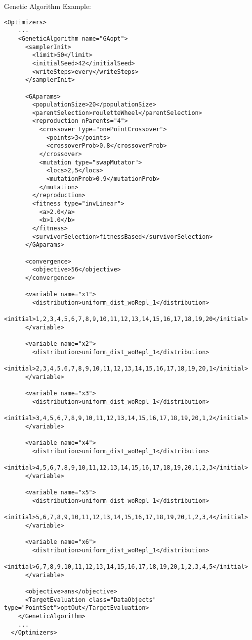 \hspace{24pt}
Genetic Algorithm Example:
\begin{lstlisting}[style=XML]
  <Optimizers>
    ...
    <GeneticAlgorithm name="GAopt">
      <samplerInit>
        <limit>50</limit>
        <initialSeed>42</initialSeed>
        <writeSteps>every</writeSteps>
      </samplerInit>

      <GAparams>
        <populationSize>20</populationSize>
        <parentSelection>rouletteWheel</parentSelection>
        <reproduction nParents="4">
          <crossover type="onePointCrossover">
            <points>3</points>
            <crossoverProb>0.8</crossoverProb>
          </crossover>
          <mutation type="swapMutator">
            <locs>2,5</locs>
            <mutationProb>0.9</mutationProb>
          </mutation>
        </reproduction>
        <fitness type="invLinear">
          <a>2.0</a>
          <b>1.0</b>
        </fitness>
        <survivorSelection>fitnessBased</survivorSelection>
      </GAparams>

      <convergence>
        <objective>56</objective>
      </convergence>

      <variable name="x1">
        <distribution>uniform_dist_woRepl_1</distribution>
        <initial>1,2,3,4,5,6,7,8,9,10,11,12,13,14,15,16,17,18,19,20</initial>
      </variable>

      <variable name="x2">
        <distribution>uniform_dist_woRepl_1</distribution>
        <initial>2,3,4,5,6,7,8,9,10,11,12,13,14,15,16,17,18,19,20,1</initial>
      </variable>

      <variable name="x3">
        <distribution>uniform_dist_woRepl_1</distribution>
        <initial>3,4,5,6,7,8,9,10,11,12,13,14,15,16,17,18,19,20,1,2</initial>
      </variable>

      <variable name="x4">
        <distribution>uniform_dist_woRepl_1</distribution>
        <initial>4,5,6,7,8,9,10,11,12,13,14,15,16,17,18,19,20,1,2,3</initial>
      </variable>

      <variable name="x5">
        <distribution>uniform_dist_woRepl_1</distribution>
        <initial>5,6,7,8,9,10,11,12,13,14,15,16,17,18,19,20,1,2,3,4</initial>
      </variable>

      <variable name="x6">
        <distribution>uniform_dist_woRepl_1</distribution>
        <initial>6,7,8,9,10,11,12,13,14,15,16,17,18,19,20,1,2,3,4,5</initial>
      </variable>

      <objective>ans</objective>
      <TargetEvaluation class="DataObjects" type="PointSet">optOut</TargetEvaluation>
    </GeneticAlgorithm>
    ...
  </Optimizers>
\end{lstlisting}

